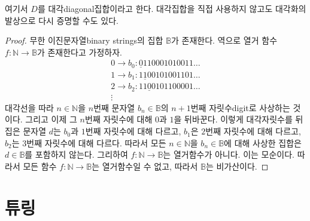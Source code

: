 \documentclass[a4paper,chapter,atbegshi]{oblivoir}
\begin{document}
여기서 $D$를 대각{\tiny diagonal}집합이라고 한다. 대각집합을 직접 사용하지
않고도 대각화의 발상으로 다시 증명할 수도 있다.
\begin{proof}
  무한 이진문자열{\tiny binary strings}의 집합 $\mathbb{B}$가 존재한다.
  역으로 열거 함수 $f:\mathbb{N}\rightarrow\mathbb{B}$가 존재한다고 가정하자.
  \[
    \begin{matrix}
      0\rightarrow b_0:\underline{0}110001010011\ldots\\
      1\rightarrow b_1:1\underline{1}00101001101\ldots\\
      2\rightarrow b_2:11\underline{0}0101100001\ldots\\
      \vdots
    \end{matrix}
  \]
  대각선을 따라 $n\in\mathbb{N}$을 $n$번째 문자열 $b_n\in\mathbb{B}$의 $n+1$번째
  자릿수{\tiny digit}로 사상하는 것이다. 그리고 이제 그 $n$번째 자릿수에 대해
  $0$과 $1$을 뒤바꾼다. 이렇게 대각자릿수를 뒤집은 문자열 $d$는 $b_0$과 $1$번째
  자릿수에 대해 다르고, $b_1$은 $2$번째 자릿수에 대해 다르고, $b_2$는 $3$번째
  자릿수에 대해 다르다. 따라서 모든 $n\in\mathbb{N}$을 $b_n\in\mathbb{B}$에
  대해 사상한 집합은 $d\in\mathbb{B}$를 포함하지 않는다. 그리하여 $f:\mathbb{N}
  \rightarrow\mathbb{B}$는 열거함수가 아니다. 이는 모순이다. 따라서 모든
  함수 $f:\mathbb{N}\rightarrow\mathbb{B}$는 열거함수일 수 없고, 따라서
  $\mathbb{B}$는 비가산이다.
\end{proof}
\chapter{튜링}
\end{document}

